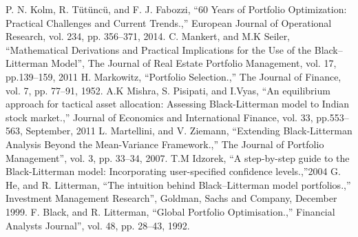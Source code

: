 \documentclass[conference]{IEEEtran}
\begin{document}
\begin{thebibliography}{00}
 P. N. Kolm, R. Tütüncü, and F. J. Fabozzi, ``60 Years of Portfolio Optimization: Practical Challenges and Current Trends.,'' European Journal of Operational Research, vol. 234, pp. 356--371, 2014.
 C. Mankert, and M.K Seiler, ``Mathematical Derivations and Practical Implications for the Use of the Black–Litterman Model'', The Journal of Real Estate Portfolio Management, vol. 17, pp.139--159, 2011
 H. Markowitz, ``Portfolio Selection.,'' The Journal of Finance, vol. 7, pp. 77--91, 1952.
 A.K Mishra, S. Pisipati, and I.Vyas, ``An equilibrium approach for tactical asset allocation: Assessing Black-Litterman model to Indian stock market.,'' Journal of Economics and International Finance, vol. 33, pp.553--563, September, 2011
 L. Martellini, and V. Ziemann, ``Extending Black-Litterman Analysis Beyond the Mean-Variance Framework.,'' The Journal of Portfolio Management'', vol. 3, pp. 33--34, 2007.
 T.M Idzorek, ``A step-by-step guide to the Black-Litterman model: Incorporating user-specified confidence levels.,''2004
 G. He, and R. Litterman, ``The intuition behind Black–Litterman model portfolios.,'' Investment Management Research'', Goldman, Sachs and Company, December 1999.
F. Black, and R. Litterman, ``Global Portfolio Optimisation.,'' Financial
Analysts Journal'', vol. 48, pp. 28--43, 1992.

\end{thebibliography}
\end{document}

